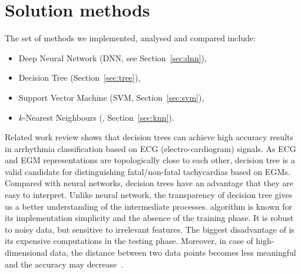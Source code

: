 \section{Solution methods}
\label{sec:methods}

The set of methods we implemented, analysed and compared include: 
\begin{itemize}
	\item Deep Neural Network (DNN, see Section~\ref{sec:dnn}),
	\item Decision Tree (Section~\ref{sec:tree}),
	\item Support Vector Machine (SVM, Section~\ref{sec:svm}),
	\item $k$-Nearest Neighbours (\knn{}, Section~\ref{sec:knn}).	
\end{itemize}

Related work review shows that decision trees can achieve high 
accuracy results in arrhythmia classification based on ECG 
(electro-cardiogram) signals. 
As ECG and EGM representations are topologically close to each other, 
decision tree is a valid candidate for distinguishing fatal/non-fatal 
tachycardias based on EGMs.
Compared with neural networks, decision trees have an advantage that 
they are easy to interpret. 
Unlike neural network, the transparency of decision tree gives us a 
better understanding of the intermediate processes.
\knn{} algorithm is known for its implementation simplicity and the 
absence of the
training phase. 
It is robust to noisy data, but sensitive to 
irrelevant features. 
The biggest disadvantage of \knn{} is its expensive computations in 
the testing phase. 
Moreover, in case of high-dimensional data, the distance between 
two data points becomes less meaningful and the accuracy may 
decrease~\cite{beyer1999nearest}. 



